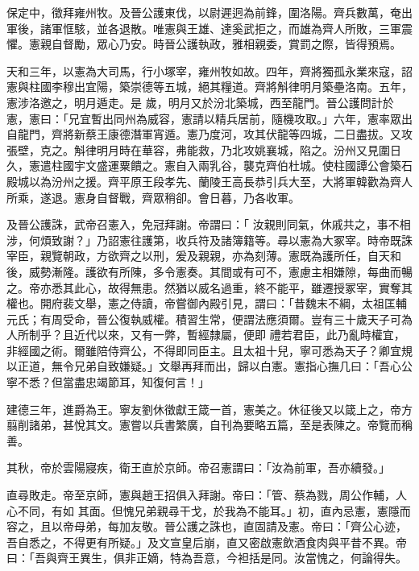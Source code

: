 \begin{pinyinscope}
 保定中，徵拜雍州牧。及晉公護東伐，以尉遲迥為前鋒，圍洛陽。齊兵數萬，奄出軍後，諸軍恇駭，並各退散。唯憲與王雄、達奚武拒之，而雄為齊人所敗，三軍震懼。憲親自督勵，眾心乃安。時晉公護執政，雅相親委，賞罰之際，皆得預焉。



 天和三年，以憲為大司馬，行小塚宰，雍州牧如故。四年，齊將獨孤永業來寇，詔憲與柱國李穆出宜陽，築崇德等五城，絕其糧道。齊將斛律明月築壘洛南。五年，憲涉洛邀之，明月遁走。是
 歲，明月又於汾北築城，西至龍門。晉公護問計於憲，憲曰：「兄宜暫出同州為威容，憲請以精兵居前，隨機攻取。」六年，憲率眾出自龍門，齊將新蔡王康德潛軍宵遁。憲乃度河，攻其伏龍等四城，二日盡拔。又攻張壁，克之。斛律明月時在華容，弗能救，乃北攻姚襄城，陷之。汾州又見圍日久，憲遣柱國宇文盛運粟饋之。憲自入兩乳谷，襲克齊伯杜城。使柱國譚公會築石殿城以為汾州之援。齊平原王段孝先、蘭陵王高長恭引兵大至，大將軍韓歡為齊人所乘，遂退。憲身自督戰，齊眾稍卻。會日暮，乃各收軍。



 及晉公護誅，武帝召憲入，免冠拜謝。帝謂曰：「
 汝親則同氣，休戚共之，事不相涉，何煩致謝？」乃詔憲往護第，收兵符及諸簿籍等。尋以憲為大冢宰。時帝既誅宰臣，親覽朝政，方欲齊之以刑，爰及親親，亦為刻薄。憲既為護所任，自天和後，威勢漸隆。護欲有所陳，多令憲奏。其間或有可不，憲慮主相嫌隙，每曲而暢之。帝亦悉其此心，故得無患。然猶以威名過重，終不能平，雖遷授冢宰，實奪其權也。開府裴文舉，憲之侍讀，帝嘗御內殿引見，謂曰：「昔魏末不綱，太祖匡輔元氏；有周受命，晉公復執威權。積習生常，便謂法應須爾。豈有三十歲天子可為人所制乎？且近代以來，又有一弊，暫經隸屬，便即
 禮若君臣，此乃亂時權宜，非經國之術。爾雖陪侍齊公，不得即同臣主。且太祖十兒，寧可悉為天子？卿宜規以正道，無令兄弟自致嫌疑。」文舉再拜而出，歸以白憲。憲指心撫几曰：「吾心公寧不悉？但當盡忠竭節耳，知復何言！」



 建德三年，進爵為王。寧友劉休徵獻王箴一首，憲美之。休征後又以箴上之，帝方翦削諸弟，甚悅其文。憲嘗以兵書繁廣，自刊為要略五篇，至是表陳之。帝覽而稱善。



 其秋，帝於雲陽寢疾，衛王直於京師。帝召憲謂曰：「汝為前軍，吾亦續發。」



 直尋敗走。帝至京師，憲與趙王招俱入拜謝。帝曰：「管、蔡為戮，周公作輔，人心不同，有如
 其面。但愧兄弟親尋干戈，於我為不能耳。」初，直內忌憲，憲隱而容之，且以帝母弟，每加友敬。晉公護之誅也，直固請及憲。帝曰：「齊公心迹，吾自悉之，不得更有所疑。」及文宣皇后崩，直又密啟憲飲酒食肉與平昔不異。帝曰：「吾與齊王異生，俱非正嫡，特為吾意，今袒括是同。汝當愧之，何論得失。




\end{pinyinscope}
